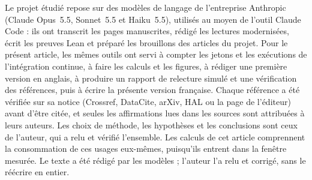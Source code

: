 \documentclass[11pt,a4paper]{article}
\begin{document}
Le projet étudié repose sur des modèles de langage de l'entreprise Anthropic (Claude Opus~5.5, Sonnet~5.5 et Haiku~5.5), utilisés au moyen de l'outil Claude Code : ils ont transcrit les pages manuscrites, rédigé les lectures modernisées, écrit les preuves Lean et préparé les brouillons des articles du projet. Pour le présent article, les mêmes outils ont servi à compter les jetons et les exécutions de l'intégration continue, à faire les calculs et les figures, à rédiger une première version en anglais, à produire un rapport de relecture simulé et une vérification des références, puis à écrire la présente version française. Chaque référence a été vérifiée sur sa notice (Crossref, DataCite, arXiv, HAL ou la page de l'éditeur) avant d'être citée, et seules les affirmations lues dans les sources sont attribuées à leurs auteurs. Les choix de méthode, les hypothèses et les conclusions sont ceux de l'auteur, qui a relu et vérifié l'ensemble. Les calculs de cet article comprennent la consommation de ces usages eux-mêmes, puisqu'ils entrent dans la fenêtre mesurée. Le texte a été rédigé par les modèles ; l'auteur l'a relu et corrigé, sans le réécrire en entier.

\renewcommand{\bibfont}{\small\raggedright}

\begin{otherlanguage}{english}
\renewcommand{\refname}{Bibliographie}

\end{otherlanguage}
\end{document}

